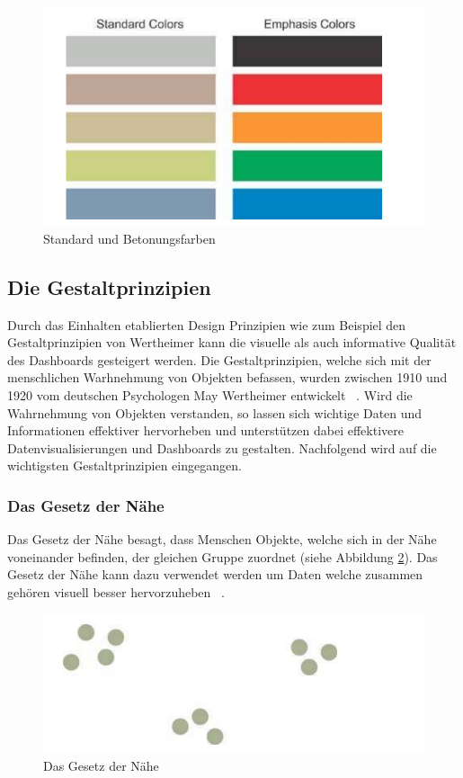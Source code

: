 \begin{figure}[h]
    \includegraphics[width=12cm]{images/standard_and_emphasis_colors.png}
    \centering
    \caption{Standard und Betonungsfarben ~\citep[S. 89]{information_dashboard_design}}
    \label{fig:standard_and_emphasis_colors}
\end{figure}

\subsection{Die Gestaltprinzipien}
Durch das Einhalten etablierten Design Prinzipien wie zum Beispiel den Gestaltprinzipien von Wertheimer kann die visuelle als auch informative Qualität des Dashboards gesteigert werden. Die Gestaltprinzipien, welche sich mit der menschlichen Warhnehmung von Objekten befassen, wurden zwischen 1910 und 1920 vom deutschen Psychologen May Wertheimer entwickelt ~\citep{gestalt_prinzipien}. Wird die Wahrnehmung von Objekten verstanden, so lassen sich wichtige Daten und Informationen effektiver hervorheben und unterstützen dabei effektivere Datenvisualisierungen und Dashboards zu gestalten. Nachfolgend wird auf die wichtigsten Gestaltprinzipien eingegangen.

\clearpage
\subsubsection{Das Gesetz der Nähe}
Das Gesetz der Nähe besagt, dass Menschen Objekte, welche sich in der Nähe voneinander befinden, der gleichen Gruppe zuordnet (siehe Abbildung \ref{fig:principle_of_proximity}). Das Gesetz der Nähe kann dazu verwendet werden um Daten welche zusammen gehören visuell besser hervorzuheben ~\citep[S. 90]{information_dashboard_design}.

\begin{figure}[h]
    \includegraphics[width=12cm]{images/principle_of_proximity.png}
    \centering
    \caption{Das Gesetz der Nähe ~\citep[S. 90]{information_dashboard_design}}
    \label{fig:principle_of_proximity}
\end{figure}


